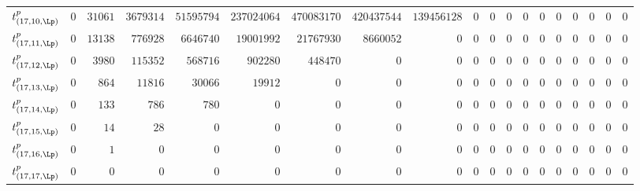 \begin{tabular}{r|rrrrrrrrrrrrrrrrrr}
  $t^{p}_{(17,10,\Lp)}$ & $0$ & $31061$ & $3679314$ & $51595794$ & $237024064$ & $470083170$ & $420437544$ & $139456128$ & $0$ & $0$ & $0$ & $0$ & $0$ & $0$ & $0$ & $0$ & $0$ & $0$ \\
  $t^{p}_{(17,11,\Lp)}$ & $0$ & $13138$ & $776928$ & $6646740$ & $19001992$ & $21767930$ & $8660052$ & $0$ & $0$ & $0$ & $0$ & $0$ & $0$ & $0$ & $0$ & $0$ & $0$ & $0$ \\
  $t^{p}_{(17,12,\Lp)}$ & $0$ & $3980$ & $115352$ & $568716$ & $902280$ & $448470$ & $0$ & $0$ & $0$ & $0$ & $0$ & $0$ & $0$ & $0$ & $0$ & $0$ & $0$ & $0$ \\
  $t^{p}_{(17,13,\Lp)}$ & $0$ & $864$ & $11816$ & $30066$ & $19912$ & $0$ & $0$ & $0$ & $0$ & $0$ & $0$ & $0$ & $0$ & $0$ & $0$ & $0$ & $0$ & $0$ \\
  $t^{p}_{(17,14,\Lp)}$ & $0$ & $133$ & $786$ & $780$ & $0$ & $0$ & $0$ & $0$ & $0$ & $0$ & $0$ & $0$ & $0$ & $0$ & $0$ & $0$ & $0$ & $0$ \\
  $t^{p}_{(17,15,\Lp)}$ & $0$ & $14$ & $28$ & $0$ & $0$ & $0$ & $0$ & $0$ & $0$ & $0$ & $0$ & $0$ & $0$ & $0$ & $0$ & $0$ & $0$ & $0$ \\
  $t^{p}_{(17,16,\Lp)}$ & $0$ & $1$ & $0$ & $0$ & $0$ & $0$ & $0$ & $0$ & $0$ & $0$ & $0$ & $0$ & $0$ & $0$ & $0$ & $0$ & $0$ & $0$ \\
  $t^{p}_{(17,17,\Lp)}$ & $0$ & $0$ & $0$ & $0$ & $0$ & $0$ & $0$ & $0$ & $0$ & $0$ & $0$ & $0$ & $0$ & $0$ & $0$ & $0$ & $0$ & $0$ \\
\end{tabular}
